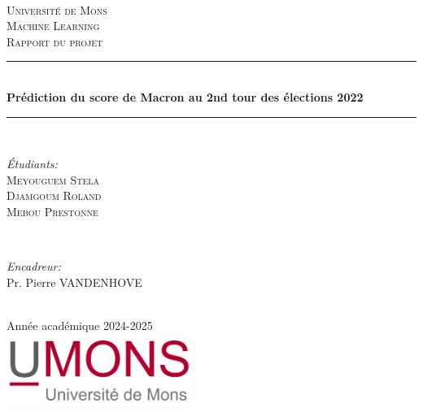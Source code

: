 \documentclass{rapportUmons}
\begin{document}
\begin{titlepage}

\newcommand{\HRule}{\rule{\linewidth}{0.5mm}}

\center 
\textsc{\LARGE}\\[1.5cm]

\vspace{3cm}

\textsc{\LARGE Université de Mons}\\[1.5cm]
\textsc{\LARGE Machine Learning }\\[0.5cm]
\textsc{\LARGE Rapport du projet}\\[0.5cm]

\HRule \\ [0.4cm]
{\huge\bfseries Prédiction du score de Macron au 2nd tour des élections 2022}\\ [0.4cm]
\HRule \\ [1.5cm]
\begin{minipage}{0.4\textwidth}
\begin{flushleft} \large
\emph{Étudiants:}\\
\textsc{Meyouguem Stela}\\
\textsc{Djamgoum Roland}\\
\textsc{Mebou Prestonne}\\


\end{flushleft}
\end{minipage}
~
\begin{minipage}{0.4\textwidth}
\begin{flushright}\large
\emph{Encadreur:} \\

Pr.  Pierre VANDENHOVE

\end{flushright}
\end{minipage}\\[2cm]


{\Large Année académique 2024-2025}\\[2cm]

\includegraphics[width=6cm]{images/umonslogo.png}\\[1cm]

\end{titlepage}
\end{document}
